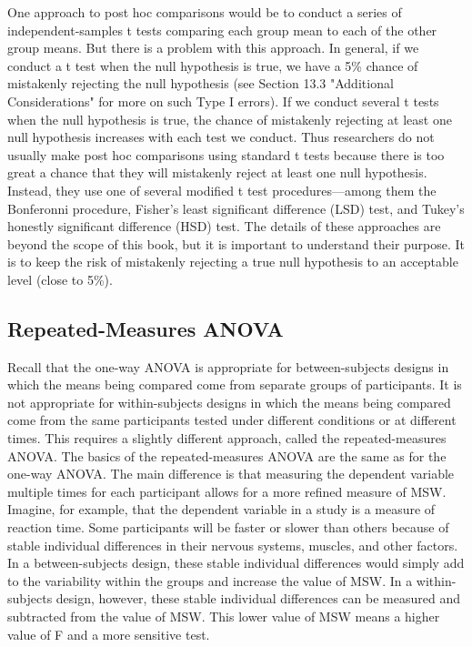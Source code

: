 One approach to post hoc comparisons would be to conduct a series of independent-samples t tests comparing each group mean to each of the other group means. But there is a problem with this approach. In general, if we conduct a t test when the null hypothesis is true, we have a 5\% chance of mistakenly rejecting the null hypothesis (see Section 13.3 "Additional Considerations" for more on such Type I errors). If we conduct several t tests when the null hypothesis is true, the chance of mistakenly rejecting at least one null hypothesis increases with each test we conduct. Thus researchers do not usually make post hoc comparisons using standard t tests because there is too great a chance that they will mistakenly reject at least one null hypothesis. Instead, they use one of several modified t test procedures---among them the Bonferonni procedure, Fisher's least significant difference (LSD) test, and Tukey's honestly significant difference (HSD) test. The details of these approaches are beyond the scope of this book, but it is important to understand their purpose. It is to keep the risk of mistakenly rejecting a true null hypothesis to an acceptable level (close to 5\%).


\subsection{Repeated-Measures ANOVA}

Recall that the one-way ANOVA is appropriate for between-subjects designs in which the means being compared come from separate groups of participants. It is not appropriate for within-subjects designs in which the means being compared come from the same participants tested under different conditions or at different times. This requires a slightly different approach, called the repeated-measures ANOVA. The basics of the repeated-measures ANOVA are the same as for the one-way ANOVA. The main difference is that measuring the dependent variable multiple times for each participant allows for a more refined measure of MSW. Imagine, for example, that the dependent variable in a study is a measure of reaction time. Some participants will be faster or slower than others because of stable individual differences in their nervous systems, muscles, and other factors. In a between-subjects design, these stable individual differences would simply add to the variability within the groups and increase the value of MSW. In a within-subjects design, however, these stable individual differences can be measured and subtracted from the value of MSW. This lower value of MSW means a higher value of F and a more sensitive test.


